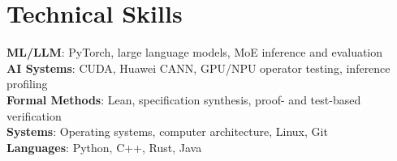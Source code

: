 \documentclass[letterpaper,11pt]{article}
\begin{document}
\section{Technical Skills}
 \begin{itemize}[leftmargin=0.15in, label={}]
    \small{\item{
     \textbf{ML/LLM}{: PyTorch, large language models, MoE inference and evaluation} \\
     \textbf{AI Systems}{: CUDA, Huawei CANN, GPU/NPU operator testing, inference profiling} \\
     \textbf{Formal Methods}{: Lean, specification synthesis, proof- and test-based verification} \\
     \textbf{Systems}{: Operating systems, computer architecture, Linux, Git} \\
     \textbf{Languages}{: Python, C++, Rust, Java}
    }}
 \end{itemize}
 \vspace{-16pt}
\end{document}
